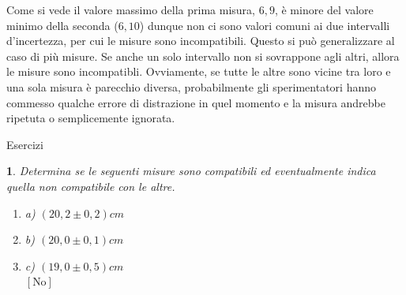 \documentclass[12pt,a4paper,oneside]{book}
\makeatletter
\renewcommand{\section}{\@startsection{section}{1}{\z@}
{-4ex \@plus -1ex \@minus -.4ex}
{1ex \@plus.2ex }
{\normalfont\large\sffamily\bfseries}}
\theoremstyle{esercizio}
\newtheorem{esercizio}{}
\newenvironment{elenco}{\begin{enumerate}[label=\bfseries\alph*.]}{\end{enumerate}}
\makeatother
\begin{document}
Come si vede il valore massimo della prima misura, $6,9$, è minore del valore minimo della seconda ($6,10$) dunque non ci sono valori comuni ai due intervalli d'incertezza, per cui le misure sono incompatibili. Questo si può generalizzare al caso di più misure. Se anche un solo intervallo non si sovrappone agli altri, allora le misure sono incompatibli. Ovviamente, se tutte le altre sono vicine tra loro e una sola misura è parecchio diversa, probabilmente gli sperimentatori hanno commesso qualche errore di distrazione in quel momento e la misura andrebbe
 ripetuta o semplicemente ignorata.
 
 \section{Esercizi}
 
\begin{esercizio}
Determina se le seguenti misure sono compatibili ed eventualmente indica quella non compatibile con le altre.
\begin{multicols}{3}
\begin{elenco}
 \item[a)] $\left(20,2 \pm 0,2\right)\si{cm}$\\
 \item[b)] $\left(20,0 \pm 0,1\right)\si{cm}$\\
 \item[c)] $\left(19,0 \pm 0,5\right)\si{cm}$ \\
 \hspace*{\fill}$\left[\text{No}\right]$
\end{elenco}
\end{multicols}

\end{esercizio} 
 
\end{document}
